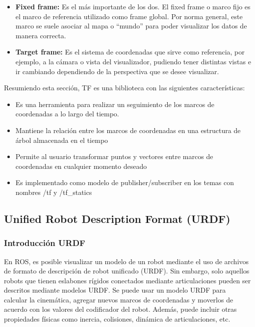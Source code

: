         \begin{itemize}
            \item \textbf{Fixed frame:} Es el más importante de los dos. El fixed frame o marco fijo es el marco de referencia utilizado como frame global. Por norma general, este marco se suele asociar al mapa o ``mundo'' para poder visualizar los datos de manera correcta.
            \item \textbf{Target frame:} Es el sistema de coordenadas que sirve como referencia, por ejemplo, a la cámara o vista del visualizador, pudiendo tener distintas vistas e ir cambiando dependiendo de la perspectiva que se desee visualizar.
        \end{itemize}
        
        Resumiendo esta sección, TF es una biblioteca con las siguientes características:
        
        \begin{itemize}
            \item Es una herramienta para realizar un seguimiento de los marcos de coordenadas a lo largo del tiempo.
            \item Mantiene la relación entre los marcos de coordenadas en una estructura de árbol almacenada en el tiempo
            \item Permite al usuario transformar puntos y vectores entre marcos de coordenadas en cualquier momento deseado
            \item Es implementado como modelo de publisher/subscriber en los temas con nombres /tf y /tf\_statics
        \end{itemize}
        
                        \newpage

    \subsection{Unified Robot Description Format (URDF)}\label{cap2_urfdf}
    
        \subsubsection{Introducción URDF}
    
        En ROS, es posible visualizar un modelo de un robot mediante el uso de archivos de formato de descripción de robot unificado (URDF). Sin embargo, solo aquellos robots que tienen eslabones rígidos conectados mediante articulaciones pueden ser descritos mediante modelos URDF.  Se puede usar un modelo URDF para calcular la cinemática, agregar nuevos marcos de coordenadas y moverlos de acuerdo con los valores del codificador del robot. Además, puede incluir otras propiedades físicas como inercia, colisiones, dinámica de articulaciones, etc. 
        
